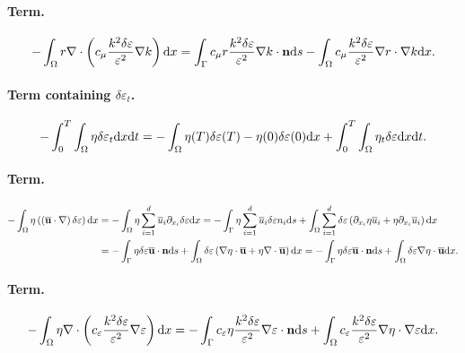 \documentclass[oneside,11pt]{book}
\numberwithin{equation}{section}
\begin{document}
\paragraph*{Term.}
\begin{align*}
    -\int_\Omega r\nabla\cdot\left(c_\mu\frac{k^2\delta\varepsilon}{\varepsilon^2}\nabla k\right){\rm d}x = \int_\Gamma c_\mu r\frac{k^2\delta\varepsilon}{\varepsilon^2}\nabla k\cdot{\bf n}{\rm d}s - \int_\Omega c_\mu\frac{k^2\delta\varepsilon}{\varepsilon^2}\nabla r\cdot\nabla k{\rm d}x.
\end{align*}
\paragraph*{Term containing $\delta\varepsilon_t$.}
\begin{align*}
    -\int_0^T\int_\Omega \eta\delta\varepsilon_t{\rm d}x{\rm d}t = -\int_\Omega \eta(T)\delta\varepsilon(T) - \eta(0)\delta\varepsilon(0){\rm d}x + \int_0^T\int_\Omega \eta_t\delta\varepsilon{\rm d}x{\rm d}t.
\end{align*}
\paragraph*{Term.}
\begin{align*}
    -\int_\Omega \eta\left(\left(\overline{\bf u}\cdot\nabla\right)\delta\varepsilon\right){\rm d}x &= -\int_\Omega \eta\sum_{i=1}^d \overline{u}_i\partial_{x_i}\delta\varepsilon{\rm d}x = -\int_\Gamma \eta\sum_{i=1}^d \overline{u}_i\delta\varepsilon n_i{\rm d}s + \int_\Omega \sum_{i=1}^d \delta\varepsilon\left(\partial_{x_i}\eta\overline{u}_i + \eta\partial_{x_i}\overline{u}_i\right){\rm d}x\\
    &= -\int_\Gamma \eta\delta\varepsilon\overline{\bf u}\cdot{\bf n}{\rm d}s + \int_\Omega \delta\varepsilon\left(\nabla\eta\cdot\overline{\bf u} + \eta\nabla\cdot\overline{\bf u}\right){\rm d}x = -\int_\Gamma \eta\delta\varepsilon\overline{\bf u}\cdot{\bf n}{\rm d}s + \int_\Omega \delta\varepsilon\nabla\eta\cdot\overline{\bf u}{\rm d}x.
\end{align*}
\paragraph*{Term.}
\begin{align*}
    -\int_\Omega \eta\nabla\cdot\left(c_\varepsilon\frac{k^2\delta\varepsilon}{\varepsilon^2}\nabla\varepsilon\right){\rm d}x = -\int_\Gamma c_\varepsilon\eta\frac{k^2\delta\varepsilon}{\varepsilon^2}\nabla\varepsilon\cdot{\bf n}{\rm d}s + \int_\Omega c_\varepsilon\frac{k^2\delta\varepsilon}{\varepsilon^2}\nabla\eta\cdot\nabla\varepsilon{\rm d}x.
\end{align*}
\end{document}
